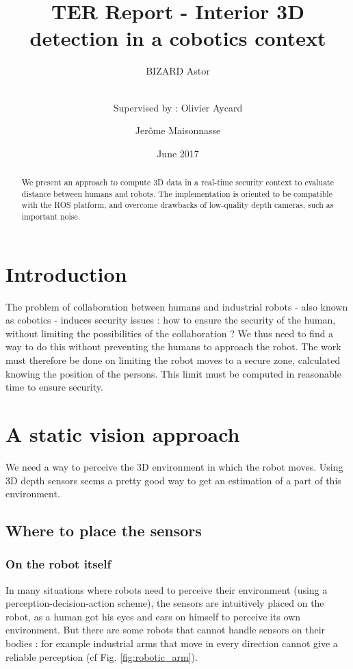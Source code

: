 \documentclass[smallextended]{svjour3}
\title{TER Report - Interior 3D detection in a cobotics context}
\author{BIZARD Astor  \\ \and \\
      Supervised by : Olivier Aycard  \and Jerôme Maisonnasse
}
\institute{
}
\date{June 2017}
\begin{document}
\maketitle

\begin{abstract}
We present an approach to compute 3D data in a real-time security context to evaluate distance between humans and robots. The implementation is oriented to be compatible with the ROS platform, and overcome drawbacks of low-quality depth cameras, such as important noise.
\end{abstract}

\section{Introduction}

The problem of collaboration between humans and industrial robots - also known as cobotics - induces security issues : how to ensure the security of the human, without limiting the possibilities of the collaboration ? We thus need to find a way to do this without preventing the humans to approach the robot. The work must therefore be done on limiting the robot moves to a secure zone, calculated knowing the position of the persons. This limit must be computed in reasonable time to ensure security.

\section{A static vision approach}

We need a way to perceive the 3D environment in which the robot moves. Using 3D depth sensors seems a pretty good way to get an estimation of a part of this environment.

\subsection{Where to place the sensors}

\subsubsection{On the robot itself}

In many situations where robots need to perceive their environment (using a perception-decision-action scheme), the sensors are intuitively placed on the robot, as a human got his eyes and ears on himself to perceive its own environment. But there are some robots that cannot handle sensors on their bodies : for example industrial arms that move in every direction cannot give a reliable perception (cf Fig. \ref{fig:robotic_arm}).
\end{document}
